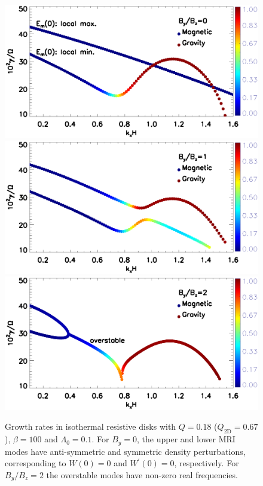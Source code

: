 \begin{figure}
  \includegraphics[width=\linewidth,clip=true,trim=0cm 2cm 0cm
    0cm]{figures/compare_growth3_tilted_resis_ep0.ps}  
  \includegraphics[width=\linewidth,clip=true,trim=0cm 2cm 0cm
    0.52cm]{figures/compare_growth3_tilted_resis_ep1.ps}
  \includegraphics[width=\linewidth,clip=true,trim=0cm 0cm 0cm
    0.52cm]{figures/compare_growth3_tilted_resis_ep2.ps}
  \caption{Growth rates in isothermal resistive disks with $Q=0.18$
    ($Q_\mathrm{2D}=0.67$), $\beta=100$ and $\Lambda_0=0.1$. For
    $B_y=0$, the upper and lower MRI modes have anti-symmetric and
    symmetric density perturbations, corresponding to $W(0)=0$ and
    $W^\prime(0)=0$, respectively.  
    For $B_y/B_z=2$ the
    overstable modes have non-zero real frequencies. 
    \label{compare_growth3_tilted_resis}}
\end{figure}

